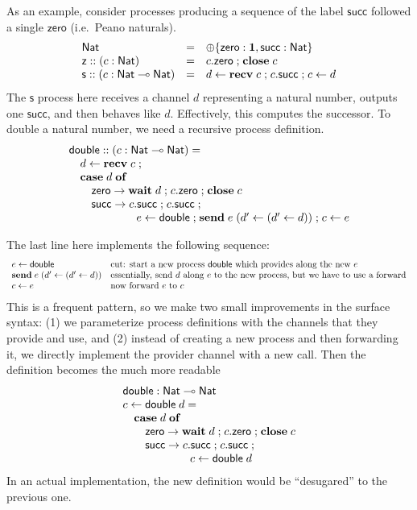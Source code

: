 \documentclass[submission,copyright,creativecommons]{eptcs}
\newcommand{\m}[1]{\mathsf{#1}}
\newcommand{\mb}[1]{\mbox{\bf #1}}
\newcommand{\semi}{\mathrel{;}}
\begin{document}
As an example, consider processes producing a sequence of the label $\m{succ}$ followed a single $\m{zero}$ (i.e.\ Peano naturals).
\[
\begin{array}{lcl}
\m{Nat} & = & \oplus\{\m{zero} : \terminate, \m{succ} : \m{Nat}\} \\
\m{z} :: (c:\m{Nat}) & = & c.\m{zero} \semi \mb{close}\; c \\
\m{s} :: (c:\m{Nat} \lolli \m{Nat}) & = & d \leftarrow \mb{recv}\; c \semi c.\m{succ} \semi c \leftarrow d
\end{array}
\]
The $\m{s}$ process here receives a channel $d$ representing a natural number, outputs one $\m{succ}$, and then behaves like $d$.  Effectively, this computes the successor.  To double a natural number, we need a recursive process definition.
\[
\begin{array}{l}
\m{double} :: (c:\m{Nat} \lolli \m{Nat}) = \\
\quad d \leftarrow \mb{recv}\; c \semi \\
\quad \mb{case}\; d\; \mb{of} \\
\quad\quad \m{zero} \rightarrow \mb{wait}\; d \semi c.\m{zero} \semi \mb{close}\; c \\
\quad\quad \m{succ} \rightarrow c.\m{succ} \semi c.\m{succ} \semi \\
\hspace{6em} e \leftarrow \m{double} \semi \mb{send}\; e\; (d' \leftarrow (d' \leftarrow d)) \semi c \leftarrow e
\end{array}
\]

The last line here implements the following sequence:
\[
\begin{array}{ll}
e \leftarrow \m{double} & \mbox{cut: start a new process $\m{double}$ which provides along the new $e$} \\
\mb{send}\; e\; (d' \leftarrow (d' \leftarrow d)) & \mbox{essentially, send $d$ along $e$ to the new process, but we have to use a forward} \\
c \leftarrow e & \mbox{now forward $e$ to $c$}
\end{array}
\]
This is a frequent pattern, so we make two small improvements in the surface syntax: (1) we parameterize process definitions with the channels that they provide and use, and (2) instead of creating a new process and then forwarding it, we directly implement the provider channel with a new call. Then the definition becomes the much more readable
\[
\begin{array}{l}
\m{double} : \m{Nat} \lolli \m{Nat} \\
c \leftarrow \m{double}\; d = \\
\quad \mb{case}\; d\; \mb{of} \\
\quad\quad \m{zero} \rightarrow \mb{wait}\; d \semi c.\m{zero} \semi \mb{close}\; c \\
\quad\quad \m{succ} \rightarrow c.\m{succ} \semi c.\m{succ} \semi \\
\hspace{6em} c \leftarrow \m{double}\; d
\end{array}
\]
In an actual implementation, the new definition would be ``desugared'' to the previous one.
\end{document}
